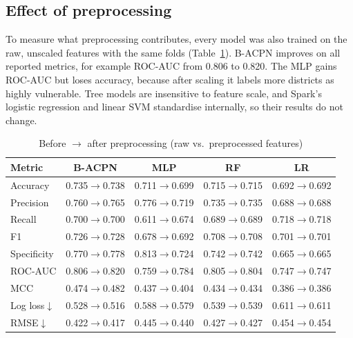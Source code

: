 \documentclass[conference]{IEEEtran}
\begin{document}
\subsection{Effect of preprocessing}
To measure what preprocessing contributes, every model was also trained on the raw, unscaled features with the same folds (Table~\ref{tab:ba}). B-ACPN improves on all reported metrics, for example ROC-AUC from 0.806 to 0.820. The MLP gains ROC-AUC but loses accuracy, because after scaling it labels more districts as highly vulnerable. Tree models are insensitive to feature scale, and Spark's logistic regression and linear SVM standardise internally, so their results do not change.

\begin{table}[!htb]
\centering
\caption{Before $\rightarrow$ after preprocessing (raw vs.\ preprocessed features)}
\label{tab:ba}
\footnotesize
\setlength{\tabcolsep}{3.5pt}
\begin{tabular}{lcccc}
\toprule
Metric & B-ACPN & MLP & RF & LR \\
\midrule
Accuracy & 0.735$\rightarrow$0.738 & 0.711$\rightarrow$0.699 & 0.715$\rightarrow$0.715 & 0.692$\rightarrow$0.692 \\
Precision & 0.760$\rightarrow$0.765 & 0.776$\rightarrow$0.719 & 0.735$\rightarrow$0.735 & 0.688$\rightarrow$0.688 \\
Recall & 0.700$\rightarrow$0.700 & 0.611$\rightarrow$0.674 & 0.689$\rightarrow$0.689 & 0.718$\rightarrow$0.718 \\
F1 & 0.726$\rightarrow$0.728 & 0.678$\rightarrow$0.692 & 0.708$\rightarrow$0.708 & 0.701$\rightarrow$0.701 \\
Specificity & 0.770$\rightarrow$0.778 & 0.813$\rightarrow$0.724 & 0.742$\rightarrow$0.742 & 0.665$\rightarrow$0.665 \\
ROC-AUC & 0.806$\rightarrow$0.820 & 0.759$\rightarrow$0.784 & 0.805$\rightarrow$0.804 & 0.747$\rightarrow$0.747 \\
MCC & 0.474$\rightarrow$0.482 & 0.437$\rightarrow$0.404 & 0.434$\rightarrow$0.434 & 0.386$\rightarrow$0.386 \\
Log loss$\downarrow$ & 0.528$\rightarrow$0.516 & 0.588$\rightarrow$0.579 & 0.539$\rightarrow$0.539 & 0.611$\rightarrow$0.611 \\
RMSE$\downarrow$ & 0.422$\rightarrow$0.417 & 0.445$\rightarrow$0.440 & 0.427$\rightarrow$0.427 & 0.454$\rightarrow$0.454 \\
\bottomrule
\end{tabular}
\end{table}
\end{document}
